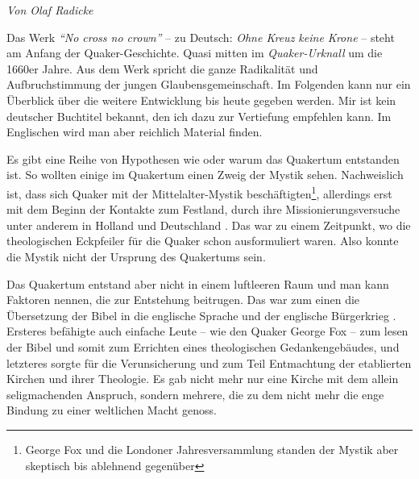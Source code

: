 


\begin{flushright}
\begin{footnotesize}
\textit{Von Olaf Radicke}
\end{footnotesize}
\end{flushright}
\smallskip

Das Werk \textit{"`No cross no crown"'} -- zu Deutsch: \textit{Ohne Kreuz keine
Krone} --
steht am Anfang der Quaker-Geschichte. Quasi mitten im
\textit{Quaker-Urknall}
um die 1660er Jahre. Aus dem Werk spricht die ganze Radikalität und
Aufbruchstimmung der jungen Glaubensgemeinschaft. Im Folgenden kann nur ein
Überblick über die weitere Entwicklung bis heute gegeben werden. Mir ist kein
deutscher Buchtitel bekannt, den ich dazu zur Vertiefung empfehlen kann. Im
Englischen wird man aber reichlich Material finden.

\medskip

Es gibt eine Reihe von Hypothesen wie oder warum das Quakertum
entstanden ist.
So
wollten einige im Quakertum einen Zweig der Mystik sehen.
Nachweislich ist, dass
sich Quaker mit der Mittelalter-Mystik beschäftigten\footnote{George Fox und die
Londoner Jahresversammlung standen der Mystik aber skeptisch bis ablehnend
gegenüber}, allerdings erst mit dem
Beginn der Kontakte zum Festland, durch ihre Missionierungsversuche
 unter
anderem in Holland und Deutschland
. Das war zu einem Zeitpunkt, wo die
theologischen Eckpfeiler für die Quaker schon ausformuliert waren. Also konnte
die Mystik nicht der Ursprung des Quakertums sein.

\medskip

Das Quakertum entstand aber nicht in einem luftleeren Raum und man kann Faktoren
nennen,
die zur Entstehung beitrugen. Das war zum einen die Übersetzung der Bibel
in die englische Sprache und der englische Bürgerkrieg
. Ersteres befähigte auch
einfache Leute -- wie den Quaker George Fox -- zum
lesen der Bibel und somit zum
Errichten eines theologischen Gedankengebäudes, und letzteres sorgte für die
Verunsicherung und zum Teil Entmachtung der etablierten Kirchen
 und ihrer
Theologie. Es gab nicht mehr nur eine Kirche mit dem allein seligmachenden
Anspruch, sondern mehrere, die zu dem nicht mehr die enge Bindung zu einer
weltlichen Macht genoss.

\medskip

